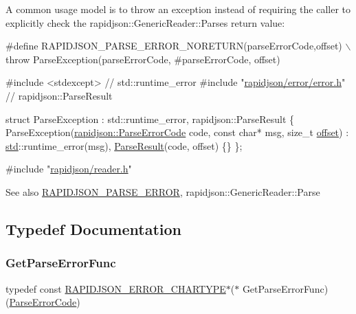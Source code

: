 A common usage model is to throw an exception instead of requiring the caller to explicitly check the rapidjson\+::\+Generic\+Reader\+::\+Parse\textquotesingle{}s return value\+:


\begin{DoxyCode}
\textcolor{preprocessor}{#define RAPIDJSON\_PARSE\_ERROR\_NORETURN(parseErrorCode,offset) \(\backslash\)}
\textcolor{preprocessor}{   throw ParseException(parseErrorCode, #parseErrorCode, offset)}

\textcolor{preprocessor}{#include <stdexcept>}               \textcolor{comment}{// std::runtime\_error}
\textcolor{preprocessor}{#include "\hyperlink{error_8h}{rapidjson/error/error.h}"} \textcolor{comment}{// rapidjson::ParseResult}

\textcolor{keyword}{struct }ParseException : std::runtime\_error, rapidjson::ParseResult \{
  ParseException(\hyperlink{group__RAPIDJSON__ERRORS_ga8d4b32dfc45840bca189ade2bbcb6ba7}{rapidjson::ParseErrorCode} code, \textcolor{keyword}{const} \textcolor{keywordtype}{char}* msg, \textcolor{keywordtype}{size\_t} 
      \hyperlink{imgui__impl__opengl3__loader_8h_ae1b92ae085ddef4b1cdca7d749339fb0}{offset})
    : \hyperlink{namespacestd}{std}::runtime\_error(msg), \hyperlink{structParseResult}{ParseResult}(code, offset) \{\}
\};

\textcolor{preprocessor}{#include "\hyperlink{reader_8h}{rapidjson/reader.h}"}
\end{DoxyCode}


\begin{DoxySeeAlso}{See also}
\hyperlink{group__RAPIDJSON__ERRORS_gae3689840fa6e89a241313f33b602f865}{R\+A\+P\+I\+D\+J\+S\+O\+N\+\_\+\+P\+A\+R\+S\+E\+\_\+\+E\+R\+R\+OR}, rapidjson\+::\+Generic\+Reader\+::\+Parse 
\end{DoxySeeAlso}


\subsection{Typedef Documentation}
\mbox{\label{group__RAPIDJSON__ERRORS_ga586548166441ab3ce30219cb35be2e04}} 
\subsubsection{\texorpdfstring{Get\+Parse\+Error\+Func}{GetParseErrorFunc}}
{\footnotesize\ttfamily typedef const \hyperlink{group__RAPIDJSON__ERRORS_ga7e4636fd48d0148f102b8a13f0539d8c}{R\+A\+P\+I\+D\+J\+S\+O\+N\+\_\+\+E\+R\+R\+O\+R\+\_\+\+C\+H\+A\+R\+T\+Y\+PE}$\ast$($\ast$ Get\+Parse\+Error\+Func) (\hyperlink{group__RAPIDJSON__ERRORS_ga8d4b32dfc45840bca189ade2bbcb6ba7}{Parse\+Error\+Code})}



